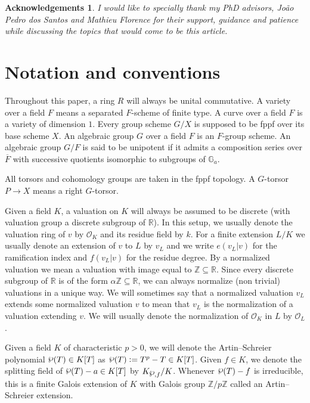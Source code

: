 \documentclass[a4paper,english,12pt]{amsart}
\newtheorem*{acknowledgements}{Acknowledgements}
\numberwithin{equation}{section}
\newcommand{\defeq}{\vcentcolon=}
\renewcommand{\wp}{\ensuremath\raisebox{\depth}{$\mathchar"17D$}}
\renewcommand{\_}{\rule{0.25cm}{0.4pt}}
\begin{document}
\begin{acknowledgements}
I would like to specially thank my PhD advisors, João Pedro dos Santos and Mathieu Florence for their support, guidance and patience while discussing the topics that would come to be this article.
\end{acknowledgements}

\section*{Notation and conventions}
Throughout this paper, a ring $R$ will always be unital commutative. A variety over a field $F$ means a separated $F$-scheme of finite type. A curve over a field $F$ is a variety of dimension $1$. Every group scheme $G/X$ is supposed to be fppf over its base scheme $X$. An algebraic group $G$ over a field $F$ is an $F$-group scheme. An algebraic group $G/F$ is said to be unipotent if it admits a composition series over $\overline{F}$ with successive quotients isomorphic to subgroups of $\mathbb{G}_{a}$.

All torsors and cohomology groups are taken in the fppf topology. A $G$-torsor $P\to X$ means a right $G$-torsor.

Given a field $K$, a valuation on $K$ will always be assumed to be discrete (with valuation group a discrete subgroup of $\mathbb{R}$). In this setup, we usually denote the valuation ring of $v$ by $\mathcal{O}_{K}$ and its residue field by $k$. For a finite extension $L/K$ we usually denote an extension of $v$ to $L$ by $v_{L}$ and we write $e(v_L|v)$ for the ramification index and $f(v_L|v)$ for the residue degree. By a normalized valuation we mean a valuation with image equal to $\mathbb{Z}\subseteq \mathbb{R}$. Since every discrete subgroup of $\mathbb{R}$ is of the form $\alpha\mathbb{Z}\subseteq\mathbb{R}$, we can always normalize (non trivial) valuations in a unique way. We will sometimes say that a normalized valuation $v_{L}$ extends some normalized valuation $v$ to mean that $v_{L}$ is the normalization of a valuation extending $v$. We will usually denote the normalization of $\mathcal{O}_{K}$ in $L$ by $\mathcal{O}_{L}$.

Given a field $K$ of characteristic $p>0$, we will denote the Artin--Schreier polynomial $\wp(T)\in K[T]$ as $\wp(T)\defeq T^{p}-T\in K[T]$. Given $f\in K$, we denote the splitting field of $\wp(T)-a\in K[T]$ by $K_{\wp,f}/K$. Whenever $\wp(T)-f$ is irreducible, this is a finite Galois extension of $K$ with Galois group $\mathbb{Z}/p\mathbb{Z}$ called an Artin--Schreier extension.
\end{document}
